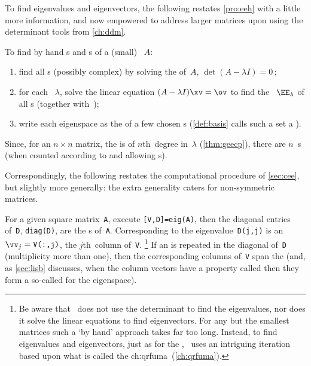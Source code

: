 To find eigenvalues and eigenvectors, the following restates \autoref{pro:eeh} with a little more information, and now empowered to address larger matrices upon using the determinant tools from \autoref{ch:ddm}.

\begin{procedure} \label{pro:geneig}
To find by hand s and s of a (small) ~\(A\):
\begin{enumerate}
\item find all s (possibly complex) by solving the  of~\(A\), \(\det(A-\lambda I)=0\)\,;
\item for each ~\(\lambda\), solve the  linear equation \((A-\lambda I)\xv=\ov\) to find the ~\(\EE_\lambda\) of all s (together with~\ov);
\item write each eigenspace as the  of a few chosen s  (\autoref{def:basis} calls such a set a ).
\end{enumerate}
Since, for an \(n\times n\) matrix, the  is of \(n\)th~degree in~\(\lambda\) (\autoref{thm:geecp}), there are \(n\)~s (when counted according to  and allowing s).
\end{procedure}

Correspondingly, the following restates the computational procedure of \autoref{sec:cee}, but slightly more generally: the extra generality caters for non-symmetric matrices.

\begin{compute}
For a given square matrix~\verb|A|, execute \verb|[V,D]=eig(A)|, then the diagonal entries of~\verb|D|, \verb|diag(D)|, are the s of~\verb|A|. 
Corresponding to the eigenvalue~\verb|D(j,j)| is an   \(\vv_j=\verb|V(:,j)|\), the \(j\)th~column of~\verb|V|.  
\footnote{Be aware that \script\ does not use the determinant to find the eigenvalues, nor does it solve the linear equations to find eigenvectors.  
For any but the smallest matrices such a `by hand' approach takes far too long.  
Instead, to find eigenvalues and eigenvectors, just as for the \svd, \script\ uses an intriguing iteration based upon what is called the \ifcsname ch:qrfuma\endcsname\ (\autoref{ch:qrfuma})\fi.}
If an  is repeated in the diagonal of~\verb|D| (multiplicity more than one), then the corresponding columns of~\verb|V| span the  
(and, as \autoref{sec:lisb} discusses, when the column vectors have a property called  then they form a so-called  for the eigenspace). 
\end{compute}



